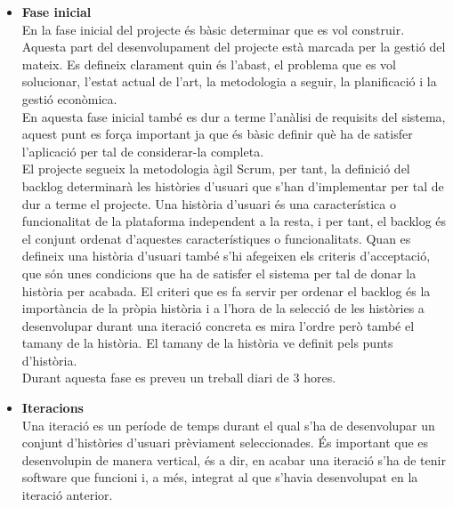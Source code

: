 \begin{itemize}
\item{}\textbf{Fase inicial}\\
En la fase inicial del projecte és bàsic determinar que es vol construir.
Aquesta part del desenvolupament del projecte està marcada per la gestió del mateix. Es defineix clarament quin és l’abast, el problema que es
vol solucionar, l’estat actual de l’art, la metodologia a seguir, la planificació i la gestió econòmica.\\

En aquesta fase inicial també es dur a terme l’anàlisi de requisits del sistema, aquest punt es força important ja que és bàsic definir què ha de
satisfer l’aplicació per tal de considerar-la completa.\\

El projecte segueix la metodologia àgil Scrum, per tant, la definició del
backlog determinarà les històries d’usuari que s’han d’implementar per
tal de dur a terme el projecte. Una història d’usuari és una característica o funcionalitat de la plataforma independent a la resta, i per tant, el backlog és el conjunt ordenat d’aquestes característiques o funcionalitats. Quan es defineix una història d’usuari també s’hi afegeixen els criteris d’acceptació, que són unes condicions que ha de satisfer el sistema per tal de donar la història per acabada. El criteri que es fa servir per ordenar el backlog és la importància de la pròpia història i a l’hora de la selecció de les històries a desenvolupar durant una iteració concreta es mira l’ordre però també el tamany de la història. El tamany de la història ve definit pels punts d’història.\\

Durant aquesta fase es preveu un treball diari de 3 hores.

\item{}\textbf{Iteracions}\\
Una iteració es un període de temps durant el qual s’ha de desenvolupar
un conjunt d’històries d’usuari prèviament seleccionades. És important
que es desenvolupin de manera vertical, és a dir, en acabar una iteració
s’ha de tenir software que funcioni i, a més, integrat al que s’havia desenvolupat en la iteració anterior.\\


\end{itemize}
